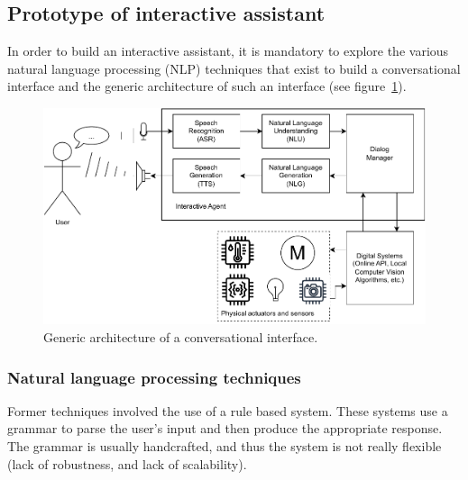 \documentclass[sigconf]{acmart}
\begin{document}
\subsection{Prototype of interactive assistant}
In order to build an interactive assistant, it is mandatory to explore the various natural language processing (NLP) techniques that exist to build a conversational interface and the generic architecture of such an interface (see figure~\ref{fig:architecture_conversational_interface}).

\begin{figure}[ht]
  \centering
  \includegraphics[width=\linewidth]{figures/schematics-generic_architecture.drawio.pdf}
  \caption{Generic architecture of a conversational interface\cite{lugrinHandbookSociallyInteractive2021}.\label{fig:architecture_conversational_interface}}
\end{figure}

\subsubsection{Natural language processing techniques}
Former techniques involved the use of a rule based system. These systems use a grammar to parse the user's input and then produce the appropriate response. The grammar is usually handcrafted, and thus the system is not really flexible (lack of robustness, and lack of scalability).
\end{document}
